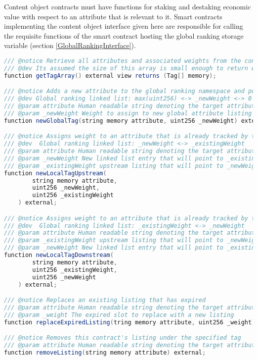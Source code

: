Content object contracts must have functions for staking and destaking economic value with respect to an attribute that is relevant to it. Smart contracts implementing the content object interface given here are responsible for calling the requisite functions of the smart contract hosting the global ranking storage variable (section \ref{GlobalRankingInterface}). 

\begin{lstlisting}[language=Java, caption=A minimal interface for a content object.]
/// @notice Retrieve all attributes and associated weights from the content object
/// @dev Its assumed the size of this array is small enough to return without pagination
function getTagArray() external view returns (Tag[] memory);

/// @notice Adds a new attribute to the global ranking namespace and pulls stake from the caller account
/// @dev Global ranking linked list: max(uint256) <-> _newWeight <-> 0
/// @param attribute Human readable string denoting the target attribute to stake
/// @param _newWeight Weight to assign to new global attribute listing
function newGlobalTag(string memory attribute, uint256 _newWeight) external;

/// @notice Assigns weight to an attribute that is already tracked by the global ranking namespace but hasn't been weighted by this content object yet, pulls stake from the caller account
/// @dev  Global ranking linked list: _newWeight <-> _existingWeight
/// @param attribute Human readable string denoting the target attribute to stake
/// @param _newWeight New linked list entry that will point to _existingWeight listing
/// @param _existingWeight upstream listing that will point to _newWeight
function newLocalTagUpstream(
        string memory attribute, 
        uint256 _newWeight, 
        uint256 _existingWeight
    ) external;

/// @notice Assigns weight to an attribute that is already tracked by the global ranking namespace but hasn't been weighted by this content object yet, pulls stake from the caller account
/// @dev  Global ranking linked list: _existingWeight <-> _newWeight
/// @param attribute Human readable string denoting the target attribute to stake
/// @param _existingWeight upstream listing that will point to _newWeight
/// @param _newWeight New linked list entry that will point to _existingWeight listing
function newLocalTagDownstream(
        string memory attribute, 
        uint256 _existingWeight, 
        uint256 _newWeight
    ) external;

/// @notice Replaces an existing listing that has expired 
/// @param attribute Human readable string denoting the target attribute to stake
/// @param _weight The expired slot to replace with a new listing
function replaceExpiredListing(tring memory attribute, uint256 _weight) external;

/// @notice Removes this contract's listing under the specified tag
/// @param attribute Human readable string denoting the target attribute to destake
function removeListing(string memory attribute) external;
\end{lstlisting}

